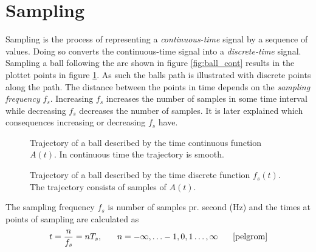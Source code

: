 \section{Sampling}
Sampling is the process of representing a \textit{continuous-time} signal by a sequence of values. Doing so converts the continuous-time signal into a \textit{discrete-time} signal. \cite{pelgrom} Sampling a ball following the arc shown in figure \ref{fig:ball_cont} results in the plottet points in figure \ref{fig:ball_disc}. As such the balls path is illustrated with discrete points along the path. The distance between the points in time depends on the \textit{sampling frequency} $f_s$. Increasing $f_s$ increases the number of samples in some time interval while decreasing $f_s$ decreases the number of samples. It is later explained which consequences increasing or decreasing $f_s$ have.
\begin{figure}[H]
\centering
\begin{minipage}{0.49\textwidth}
\centering
{}
\caption{Trajectory of a ball described by the time continuous function $A(t)$. In continuous time the trajectory is smooth.}
\label{fig:ball_cont}
\end{minipage}
\centering
\begin{minipage}{0.49\textwidth}
\centering
{}
\caption{Trajectory of a ball described by the time discrete function $f_s(t)$. The trajectory consists of samples of $A(t)$.}
\label{fig:ball_disc}
\end{minipage}
\end{figure}
\noindent The sampling frequency $f_s$ is number of samples pr. second (Hz) and the times at points of sampling are calculated as
\begin{equation}\label{eq:sample_freq}
t=\frac{n}{f_s}=nT_s, \phantom{mm} n=-\infty,\hdots-1,0,1\hdots,\infty \phantom{mm}\text{\cite{pelgrom}}
\end{equation}

